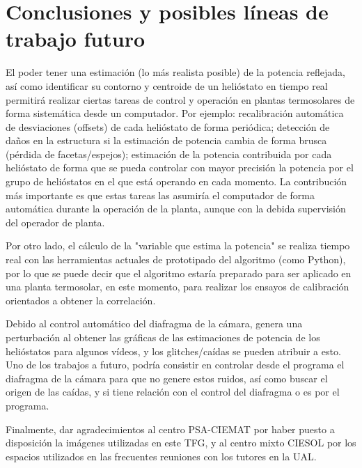 \chapter{Conclusiones y posibles líneas de trabajo futuro}
 
El poder tener una estimación (lo más realista posible) de la potencia reflejada, así como identificar su contorno y centroide de un helióstato en tiempo real permitirá realizar ciertas tareas de control y operación en plantas termosolares de forma sistemática desde un computador. Por ejemplo: recalibración automática de desviaciones (offsets) de cada helióstato de forma periódica; detección de daños en la estructura si la estimación de potencia cambia de forma brusca (pérdida de facetas/espejos); estimación de la potencia contribuida por cada helióstato de forma que se pueda controlar con mayor precisión la potencia por el grupo de helióstatos en el que está operando en cada momento. La contribución más importante es que estas tareas las asumiría el computador de forma automática durante la operación de la planta, aunque con la debida supervisión del operador de planta.

Por otro lado, el cálculo de la "variable que estima la potencia" se realiza tiempo real con las herramientas actuales de prototipado del algoritmo (como Python), por lo que se puede decir que el algoritmo estaría preparado para ser aplicado en una planta termosolar, en este momento, para realizar los ensayos de calibración orientados a obtener la correlación.

Debido al control automático del diafragma de la cámara, genera una perturbación al obtener las gráficas de las estimaciones de potencia de los helióstatos para algunos vídeos, y los glitches/caídas se pueden atribuir a esto. Uno de los trabajos a futuro, podría consistir en controlar desde el programa el diafragma de la cámara para que no genere estos ruidos, así como buscar el origen de las caídas, y si tiene relación con el control del diafragma o es por el programa.

Finalmente, dar agradecimientos al centro PSA-CIEMAT por haber puesto a disposición la imágenes utilizadas en este TFG, y al centro mixto CIESOL por los espacios utilizados en las frecuentes reuniones con los tutores en la UAL.